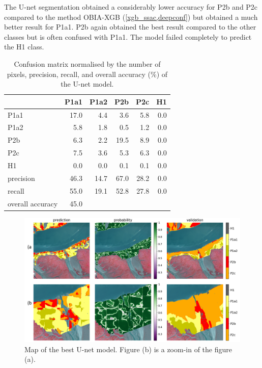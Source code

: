\documentclass{isprs} %
\begin{document}
The U-net segmentation obtained a considerably lower accuracy for P2b and P2c compared to the method OBIA-XGB (\cref{xgb_ssac,deepconf}) but obtained a much better result for P1a1. P2b again obtained the best result compared to the other classes but is often confused with P1a1. The model failed completely to predict the H1 class.  

 \begin{table}
  \centering
\begin{tabular}{lrrrrr}
\toprule
{} &  P1a1 &  P1a2 &   P2b &   P2c &   H1 \\
\midrule
P1a1             &  17.0 &   4.4 &   3.6 &   5.8 &  0.0 \\
P1a2             &   5.8 &   1.8 &   0.5 &   1.2 &  0.0 \\
P2b              &   6.3 &   2.2 &  19.5 &   8.9 &  0.0 \\
P2c              &   7.5 &   3.6 &   5.3 &   6.3 &  0.0 \\
H1               &   0.0 &   0.0 &   0.1 &   0.1 
&  0.0 \\
\midrule
precision       &  46.3 &  14.7 &  67.0 &  28.2 &  0.0    \\
recall           &  55.0 &  19.1 &  52.8 &  27.8 &  0.0 \\
overall accuracy &  45.0 &       &       &       &      \\
\bottomrule
\end{tabular}
\caption{
Confusion matrix normalised by the number of pixels, precision, recall, and overall accuracy (\%) of the U-net model.}
\label{deepconf}
\end{table}

\begin{figure}
    \centering
    \includegraphics[scale=0.3]{figures/prediction_westerscheldt_merged.png}
    \caption{Map of the best U-net model. Figure (b) is a zoom-in of the figure (a).}
    \label{fig:deepsp}
\end{figure}
\end{document}
